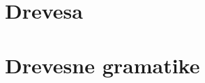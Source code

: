 \documentclass{article}
\newcommand{\Ex}{\textbf{Npr.:}\ }
\newcommand{\Set}[1]{\mathbf{#1}}
\newcommand{\Symbol}[1]{\textcolor{blue}{#1}}
\newcommand{\Grammar}{G}
\newcommand{\Alphabet}{\symbfup{\Sigma}}
\newcommand{\Terminals}{\Set{T}}
\newcommand{\NonTerminals}{\Set{N}}
\newcommand{\Productions}{\Set{P}}
\newcommand{\StartSymbol}{S}
\newcommand{\Null}{\varepsilon}
\begin{document}
\section{Drevesa}



\section{Drevesne gramatike}
%
\end{document}
